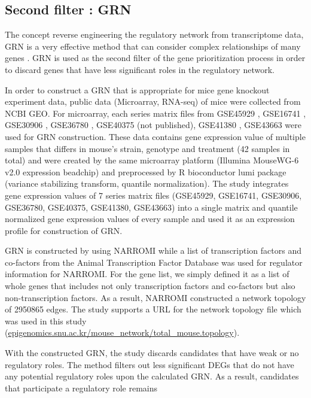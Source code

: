 \documentclass[oneside,phd]{snuthesis}
\begin{document}
\subsection{Second filter : GRN}

The concept reverse engineering the regulatory network from transcriptome data, GRN is a very effective method that can consider complex relationships of many genes \citep{basso2005reverse}.
GRN is used as the second filter of the gene prioritization process in order to discard genes that have less significant roles in the regulatory network.

In order to construct a GRN that is appropriate for mice gene knockout experiment data, public data (Microarray, RNA-seq) of mice were collected from NCBI GEO. 
For microarray, each series matrix files from GSE45929 \citep{ramsey2013fgfr2}, GSE16741 \citep{yun2010microrna}, GSE30906 \citep{shan2012cigarette}, GSE36780 \citep{bae2012mirna}, GSE40375 (not published), GSE41380 \citep{nusinow2012network}, GSE43663 \citep{ruan2013proteoglycan} were used for GRN construction. 
These data contains gene expression value of multiple samples that differs in mouse’s strain, genotype and treatment (42 samples in total) and were created by the same microarray platform (Illumina MouseWG-6 v2.0 expression beadchip) and preprocessed by R bioconductor lumi package \citep{du2008lumi} (variance stabilizing transform, quantile normalization). 
The study integrates gene expression values of 7 series matrix files (GSE45929, GSE16741, GSE30906, GSE36780, GSE40375, GSE41380, GSE43663) into a single matrix and quantile normalized gene expression values of every sample and used it as an expression profile for construction of GRN.

GRN is constructed by using NARROMI \citep{zhang2012narromi} while a list of transcription factors and co-factors from the Animal Transcription Factor Database \citep{zhang2011animaltfdb} was used for regulator information for NARROMI.
For the gene list, we simply defined it as a list of whole genes that includes not only transcription factors and co-factors but also non-transcription factors. 
As a result, NARROMI constructed a network topology of 2950865 edges. 
The study supports a URL for the network topology file which was used in this study (\url{epigenomics.snu.ac.kr/mouse\_network/total\_mouse.topology}).

With the constructed GRN, the study discards candidates that have weak or no regulatory roles. 
The method filters out less significant DEGs that do not have any potential regulatory roles upon the calculated GRN.
As a result, candidates that participate a regulatory role remains
\end{document}
